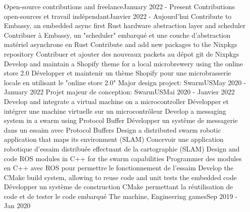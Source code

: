     \resumeSubHeadingListStart
        \resumeProjectHeadingEnFr
              {Open-source contributions and freelance}{January 2022 - Present}
              {Contributions open-sources et travail indépendant}{Janvier 2022 - Aujourd’hui}
                \resumeItemListStart
                    \resumeItemEnFr
                        {Contribute to Embassy, an embedded async first Rust hardware abstraction layer and scheduler}
                        {Contribuer à Embassy, un "scheduler" embarqué et une couche d'abstraction matériel asynchrone en Rust}
                    \resumeItemEnFr
                        {Contribute and add new packages to the Nixpkgs repository}
                        {Contribuer et ajouter des nouveaux packets au dépot git de Nixpkgs}
                    \resumeItemEnFr
                        {Develop and maintain a Shopify theme for a local microbrewery using the online store 2.0}
                        {Développer et maintenir un thème Shopify pour une microbrasserie locale en utilisant le "online store 2.0"}
                \resumeItemListEnd
      \resumeProjectHeadingEnFr
          {Major design project: SwarmUS}{May 2020 - January 2022}
          {Projet majeur de conception: SwarmUS}{Mai 2020 - Janvier 2022}
            \resumeItemListStart
                \resumeItemEnFr
                    {Develop and integrate a virtual machine on a microcontroller}
                    {Développer et intégrer une machine virtuelle sur un microcontrôleur}
                \resumeItemEnFr
                    {Develop a messaging system in a swarm using Protocol Buffer}
                    {Développer un système de messagerie dans un essaim avec Protocol Buffers}
                \resumeItemEnFr
                    {Design a distributed swarm robotic application that maps its environment (SLAM)}
                    {Concevoir une application robotique d’essaim distribuée effectuant de la cartographie (SLAM)}
                \resumeItemEnFr
                    {Design and code ROS modules in C++ for the swarm capabilities}
                    {Programmer des modules en C++ avec ROS pour permettre le fonctionnement de l’essaim}
                \resumeItemEnFr
                    {Develop the CMake build system, allowing to reuse code and unit tests the embedded code}
                    {Développer un système de construction CMake permettant la réutilisation de code et de tester le code embarqué}
            \resumeItemListEnd
      \resumeProjectHeadingEnFr
          {The machine, Engineering games}{Sep 2019 - Jan 2020}
